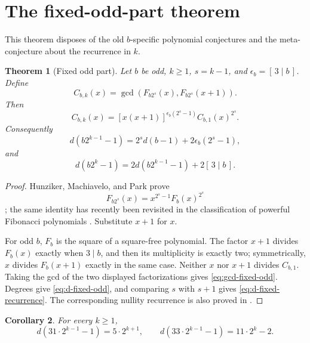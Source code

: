 \documentclass[a4paper]{article}
\newtheorem{theorem}{Theorem}[section]
\newtheorem{corollary}[theorem]{Corollary}
\begin{document}
\section{The fixed-odd-part theorem}
\label{sec:fixed-odd}

This theorem disposes of the old $b$-specific polynomial conjectures and
the meta-conjecture about the recurrence in $k$.

\begin{theorem}[Fixed odd part]\label{thm:fixed-odd}
	Let $b$ be odd, $k\geq1$, $s=k-1$, and
	$\epsilon_b=[\,3\mid b\,]$.  Define
	\[
		C_{b,k}(x)
		=\gcd\!\left(F_{b2^s}(x),F_{b2^s}(x+1)\right).
	\]
	Then
	\begin{equation}\label{eq:gcd-fixed-odd}
		C_{b,k}(x)
		=[x(x+1)]^{\epsilon_b(2^s-1)}
		 C_{b,1}(x)^{2^s}.
	\end{equation}
	Consequently
	\begin{equation}\label{eq:d-fixed-odd}
		d\!\left(b2^{k-1}-1\right)
		=2^s d(b-1)+2\epsilon_b(2^s-1),
	\end{equation}
	and
	\begin{equation}\label{eq:d-fixed-recurrence}
		d\!\left(b2^k-1\right)
		=2d\!\left(b2^{k-1}-1\right)+2[\,3\mid b\,].
	\end{equation}
\end{theorem}

\begin{proof}
	Hunziker, Machiavelo, and Park prove
	\[
		F_{b2^s}(x)=x^{2^s-1}F_b(x)^{2^s}
	\]
	\cite{HunzikerMachiaveloPark2004}; the same identity has recently been
	revisited in the classification of powerful Fibonacci polynomials
	\cite{BatesEtAl2027}.  Substitute $x+1$ for $x$.

	For odd $b$, $F_b$ is the square of a square-free polynomial.
	The factor $x+1$ divides $F_b(x)$ exactly when $3\mid b$, and then its
	multiplicity is exactly two; symmetrically, $x$ divides $F_b(x+1)$
	exactly in the same case.  Neither $x$ nor $x+1$ divides
	$C_{b,1}$.  Taking the gcd of the two displayed factorizations gives
	\eqref{eq:gcd-fixed-odd}.  Degrees give \eqref{eq:d-fixed-odd}, and
	comparing $s$ with $s+1$ gives \eqref{eq:d-fixed-recurrence}.
	The corresponding nullity recurrence is also proved in
	\cite{BoylesSutner}.
\end{proof}

\begin{corollary}\label{cor:31-33}
	For every $k\geq1$,
	\[
		d\!\left(31\cdot2^{k-1}-1\right)=5\cdot2^{k+1},
		\qquad
		d\!\left(33\cdot2^{k-1}-1\right)=11\cdot2^k-2.
	\]
\end{corollary}
\end{document}
